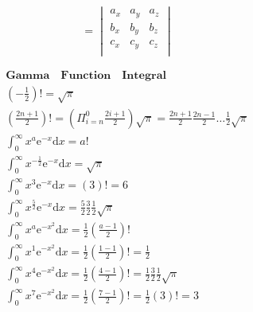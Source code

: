 \documentclass{article}
\begin{document}
\begin{displaymath}
    [\overrightarrow{abc}]= 
    \begin{vmatrix}
        a_{x} & a_{y} & a_{z} \\
        b_{x} & b_{y} & b_{z} \\
        c_{x} & c_{y} & c_{z} \\
    \end{vmatrix}
\end{displaymath}

\clearpage 

\begin{align*}
    \bm{Gamma \quad Function \quad Integral} \\ 
    \left(-\frac{1}{2}\right)! = \sqrt{\pi} \\ 
    \left(\frac{2n+1}{2}\right)! = \left(\Pi_{i=n}^{0}{\frac{2i+1}{2}}\right)\sqrt{\pi} = \frac{2n+1}{2}\frac{2n-1}{2}\dots\frac{1}{2}\sqrt{\pi} \\ 
    \int_{0}^{\infty} x^{a}\mathrm{e}^{-x}\mathrm{d}x = a! \\
    \int_{0}^{\infty} x^{-\frac{1}{2}}\mathrm{e}^{-x}\mathrm{d}x = \sqrt{\pi}\\ 
    \int_{0}^{\infty} x^{3}\mathrm{e}^{-x}\mathrm{d}x = (3)! = 6 \\ 
    \int_{0}^{\infty} x^{\frac{5}{2}}\mathrm{e}^{-x}\mathrm{d}x = \frac{5}{2}\frac{3}{2}\frac{1}{2}\sqrt{\pi}\\  
    \int_{0}^{\infty} x^{a}\mathrm{e}^{-x^2}\mathrm{d}x = \frac{1}{2} \left(\frac{a-1}{2}\right)! \\ 
    \int_{0}^{\infty} x^{1}\mathrm{e}^{-x^2}\mathrm{d}x = \frac{1}{2} \left(\frac{1-1}{2}\right)! = \frac{1}{2} \\
    \int_{0}^{\infty} x^{4}\mathrm{e}^{-x^2}\mathrm{d}x = \frac{1}{2} \left(\frac{4-1}{2}\right)! = \frac{1}{2}\frac{3}{2}\frac{1}{2}\sqrt{\pi}\\ 
    \int_{0}^{\infty} x^{7}\mathrm{e}^{-x^2}\mathrm{d}x = \frac{1}{2} \left(\frac{7-1}{2}\right)! = \frac{1}{2}(3)! = 3\\
\end{align*}

\cleardoublepage
\end{document}
